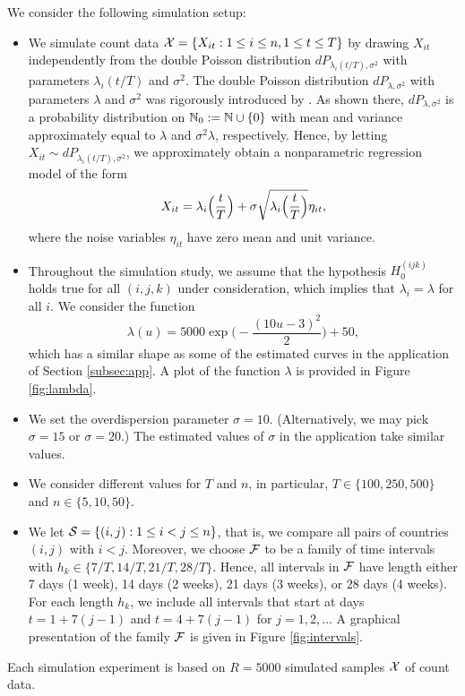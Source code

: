 \documentclass[a4paper,12pt]{article}
\numberwithin{equation}{section}
\begin{document}
We consider the following simulation setup: 
\begin{itemize}[leftmargin=0.45cm]

\item We simulate count data $\mathcal{X} = \{ X_{it}: 1 \le i \le n, 1 \le t \le T \}$ by drawing $X_{it}$ independently from the double Poisson distribution $dP_{\lambda_i(t/T),\sigma^2}$ with parameters $\lambda_i(t/T)$ and $\sigma^2$. The double Poisson distribution $dP_{\lambda,\sigma^2}$ with parameters $\lambda$ and $\sigma^2$ was rigorously introduced by \cite{Efron1986}. As shown there, $dP_{\lambda,\sigma^2}$ is a probability distribution on $\mathbb{N}_0 := \mathbb{N} \cup \{ 0 \}$ with mean and variance approximately equal to $\lambda$ and $\sigma^2 \lambda$, respectively. Hence, by letting $X_{it} \sim dP_{\lambda_i(t/T),\sigma^2}$, we approximately obtain a nonparametric regression model of the form 
\[ X_{it} = \lambda_i\Big(\frac{t}{T}\Big) + \sigma \sqrt{\lambda_i\Big(\frac{t}{T}\Big)} \eta_{it}, \]
where the noise variables $\eta_{it}$ have zero mean and unit variance.

\item Throughout the simulation study, we assume that the hypothesis $H_0^{(ijk)}$ holds true for all $(i,j,k)$ under consideration, which implies that $\lambda_i = \lambda$ for all $i$. We consider the function 
\[ \lambda(u) = 5000 \exp\Big(-\frac{(10 u-3)^2}{2}\Big) + 50, \]
which has a similar shape as some of the estimated curves in the application of Section \ref{subsec:app}. A plot of the function $\lambda$ is provided in Figure \ref{fig:lambda}. 

\item We set the overdispersion parameter $\sigma = 10$. (Alternatively, we may pick $\sigma=15$ or $\sigma=20$.) The estimated values of $\sigma$ in the application take similar values.

\item We consider different values for $T$ and $n$, in particular, $T \in \{100,250, 500\}$ and $n \in \{5,10,50\}$. 

\item We let $\mathcal{S} = \{ (i,j): 1 \le i < j \le n\}$, that is, we compare all pairs of countries $(i,j)$ with $i < j$. Moreover, we choose $\mathcal{F}$ to be a family of time intervals with $h_k \in \{ 7/T,14/T,21/T,28/T \}$. Hence, all intervals in $\mathcal{F}$ have length either 7 days (1 week), 14 days (2 weeks), 21 days (3 weeks), or 28 days (4 weeks). For each length $h_k$, we include all intervals that start at days $t = 1 + 7(j-1)$ and $t = 4 + 7(j-1)$ for $j=1,2,\ldots$ A graphical presentation of the family $\mathcal{F}$ is given in Figure \ref{fig:intervals}. 

\end{itemize}
Each simulation experiment is based on $R=5 000$ simulated samples $\mathcal{X}$ of count data. 
\end{document}
